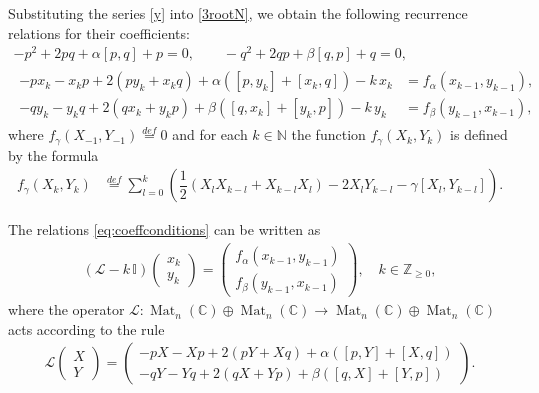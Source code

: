 \documentclass{article}
\theoremstyle{plain}
\DeclareMathOperator{\Mat}{Mat}
\newcommand{\brackets}[1]{\left( #1 \right)}
\newcommand{\LieBrackets}[1]{\left[ #1 \right]}
\begin{document}
Substituting the series \eqref{y} into  \eqref{3rootN}, we obtain the following recurrence relations for their coefficients:
\begin{gather}
    \label{eq:resconditions}
    - p^2 
    + 2 p q 
    + \alpha \LieBrackets{p, q}
    + p
    = 0,
    \qquad
    - q^2 
    + 2 q p 
    + \beta \LieBrackets{q, p}
    + q
    = 0,
    \\[3mm]
    \begin{aligned}
    \label{eq:coeffconditions}
    -  p x_k - x_k p
    + 2 \brackets{p y_k + x_k q}
    + \alpha \brackets{
    \LieBrackets{p, y_k}
    + \LieBrackets{x_k, q}
    }
    - k \, x_k
    &= f_{\alpha} \brackets{x_{k-1}, y_{k-1}},
    \\[2mm]
    - q y_k - y_k q
    + 2 \brackets{q x_k + y_k p}
    + \beta \brackets{
    \LieBrackets{q, x_k}
    + \LieBrackets{y_k, p}
    }
    - k \, y_k 
    &= f_{\beta} \brackets{y_{k-1}, x_{k-1}},
    \end{aligned}
\end{gather}
where  $f_{\gamma} \brackets{X_{-1}, Y_{-1}}\stackrel{def}{=}0$ and for each  $ k \in \mathbb{N}$ the function $f_{\gamma} \brackets{X_k, Y_k}$ is defined by the formula  
\begin{align}
    \label{eq:rhsFgamma}
    f_{\gamma} \brackets{X_k, Y_k}
    &\stackrel{def}{=} \sum_{l = 0}^{k}
    \brackets{
    \dfrac{1}{2} (X_l X_{k - l}+X_{k - l} X_l)
    - 2 X_{l} Y_{k - l}
    - \gamma \LieBrackets{X_{l}, Y_{k - l}}
    }.
\end{align}

The relations \eqref{eq:coeffconditions} can be written as 
\begin{gather}
    \label{eq:matrixformofconditions}
    \brackets{
    \mathcal{L}
    - k \, \mathbb{I}
    }
    \begin{pmatrix}
    x_k \\[1mm]
    y_k
    \end{pmatrix}
    = 
    \begin{pmatrix}
    f_{\alpha} \brackets{x_{k-1}, y_{k-1}} \\[1mm]
    f_{\beta} \brackets{y_{k-1}, x_{k-1}}
    \end{pmatrix}
    ,
    \quad 
    k \in \mathbb{Z}_{\geq 0}
    ,
\end{gather}
where the operator $\mathcal{L} : \Mat_n \brackets{\mathbb{C}} \oplus \Mat_n \brackets{\mathbb{C}} \to \Mat_n \brackets{\mathbb{C}} \oplus \Mat_n \brackets{\mathbb{C}}$ acts according to the rule
\begin{gather} \label{eq:Loperator}
    \mathcal{L}
    \begin{pmatrix}
    X \\[1mm]
    Y
    \end{pmatrix}
    =
    \begin{pmatrix}
    - p X - X p
    + 2 \brackets{p Y + X q}
    + \alpha \brackets{
    \LieBrackets{p, Y}
    + \LieBrackets{X, q}
    }
    \\[1mm]
    -  q Y - Y q
    + 2 \brackets{q X + Y p}
    + \beta \brackets{
    \LieBrackets{q, X}
    + \LieBrackets{Y, p}
    }
    \end{pmatrix}
    .
\end{gather}
\end{document}
